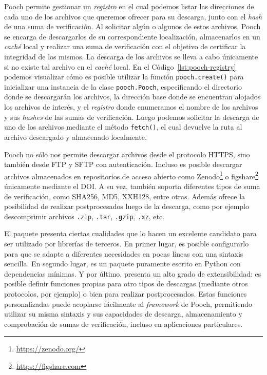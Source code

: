 Pooch permite gestionar un \emph{registro} en el cual podemos listar las
direcciones de cada uno de los archivos que queremos ofrecer para su descarga,
junto con el \emph{hash} de una suma de verificación. Al solicitar algún
o algunos de estos archivos, Pooch se encarga de descargarlos de su
correspondiente localización, almacenarlos en un \emph{caché} local y realizar
una suma de verificación con el objetivo de certificar la integridad de los
mismos.
La descarga de los archivos se lleva a cabo únicamente si no existe tal archivo
en el \emph{caché} local.
En el Código~\ref{lst:pooch-registry} podemos visualizar cómo es posible
utilizar la función \texttt{pooch.create()} para inicializar una instancia de
la clase \texttt{pooch.Pooch}, especificando el directorio donde se descargarán
los archivos, la dirección base donde se encuentran alojados los archivos de
interés, y el \emph{registro} donde enumeramos el nombre de los archivos y sus
\emph{hashes} de las sumas de verificación.
Luego podemos solicitar la descarga de uno de los archivos mediante el método
\texttt{fetch()}, el cual devuelve la ruta al archivo descargado y almacenado
localmente.

Pooch no sólo nos permite descargar archivos desde el protocolo HTTPS,
sino también desde FTP y SFTP con autenticación.
Incluso es posible descargar archivos almacenados en repositorios de acceso
abierto como Zenodo\footnote{\url{https://zenodo.org/}}
o figshare\footnote{\url{https://figshare.com}} únicamente mediante el
\ac{DOI}.
A su vez, también soporta diferentes tipos de suma de verificación, como
SHA256, MD5, XXH128, entre otras.
Además ofrece la posibilidad de realizar postprocesados luego de la descarga,
como por ejemplo descomprimir archivos \texttt{.zip}, \texttt{.tar},
\texttt{.gzip}, \texttt{.xz}, etc.

El paquete presenta ciertas cualidades que lo hacen un excelente candidato para
ser utilizado por librerías de terceros.
En primer lugar, es posible configurarlo para que se adapte a diferentes
necesidades en pocas líneas con una sintaxis sencilla.
En segundo lugar, es un paquete puramente escrito en Python con dependencias
mínimas.
Y por último, presenta un alto grado de extensibilidad: es posible definir
funciones propias para otro tipos de descargas (mediante otros protocolos, por
ejemplo) o bien para realizar postprocesados. Estas funciones personalizadas
puede acoplarse fácilmente al \emph{framework} de Pooch, permitiendo
utilizar su misma sintaxis y sus capacidades de descarga, almacenamiento
y comprobación de sumas de verificación, incluso en aplicaciones particulares.


